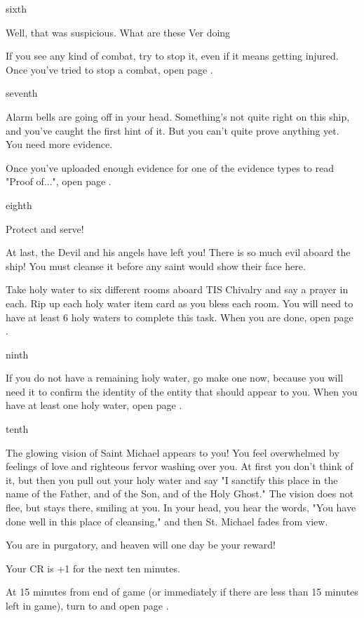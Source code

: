 \documentclass[greennotebook]{guildcamp4} %
\begin{document}
\begin{page}{sixth}

Well, that was suspicious. What are these Ver doing 

If you see any kind of combat, try to stop it, even if it means getting injured. Once you've tried to stop a combat, open page .

\end{page}

\begin{page}{seventh}

Alarm bells are going off in your head. Something's not quite right on this ship, and you've caught the first hint of it. But you can't quite prove anything yet. You need more evidence.

Once you've uploaded enough evidence for one of the evidence types to read "Proof of...", open page .

\end{page}

\begin{page}{eighth}

Protect and serve!

At last, the Devil and his angels have left you! There is so much evil aboard the ship! You must cleanse it before any saint would show their face here.

Take holy water to six different rooms aboard TIS Chivalry and say a prayer in each. Rip up each holy water item card as you bless each room. You will need to have at least 6 holy waters to complete this task. When you are done, open page .

\end{page}

\begin{page}{ninth}

If you do not have a remaining holy water, go make one now, because you will need it to confirm the identity of the entity that should appear to you. When you have at least one holy water, open page .

\end{page}

\begin{page}{tenth}

The glowing vision of Saint Michael appears to you! You feel overwhelmed by feelings of love and righteous fervor washing over you. At first you don't think of it, but then you pull out your holy water and say "I sanctify this place in the name of the Father, and of the Son, and of the Holy Ghost." The vision does not flee, but stays there, smiling at you. In your head, you hear the words, "You have done well in this place of cleansing," and then St. Michael fades from view. 

You are in purgatory, and heaven will one day be your reward!

Your CR is +1 for the next ten minutes.

At 15 minutes from end of game (or immediately if there are less than 15 minutes left in game), turn to and open page .

\end{page}
\end{document}
